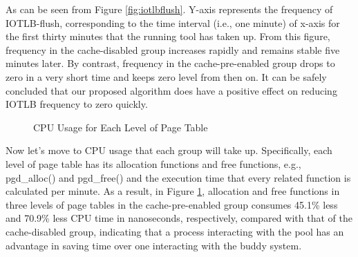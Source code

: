 As can be seen from Figure \ref{fig:iotlbflush}. Y-axis represents the frequency of IOTLB-flush, corresponding to the time interval (i.e., one minute) of x-axis for the first thirty minutes that the running tool has taken up. From this figure, frequency in the cache-disabled group increases rapidly and remains stable five minutes later. By contrast, frequency in the cache-pre-enabled group drops to zero in a very short time and keeps zero level from then on. It can be safely concluded that our proposed algorithm does have a positive effect on reducing IOTLB frequency to zero quickly.

\begin{figure}
\centering
{}
\hspace{1in}
\hspace{1in}
\caption{CPU Usage for Each Level of Page Table}
\label{fig:PGtime} %
\end{figure}

Now let’s move to CPU usage that each group will take up. Specifically, each level of page table has its allocation functions and free functions, e.g., pgd\_alloc() and pgd\_free() and the execution time that every related function is calculated per minute. As a result, in Figure \ref{fig:PGtime}, allocation and free functions in three levels of page tables in the cache-pre-enabled group consumes 45.1\% less and 70.9\% less CPU time in nanoseconds, respectively, compared with that of the cache-disabled group, indicating that a process interacting with the pool has an advantage in saving time over one interacting with the buddy system.

